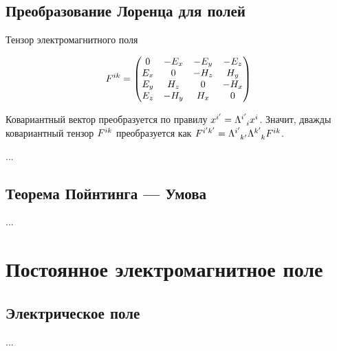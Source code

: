\documentclass{article}
\begin{document}
\subsection{Преобразование Лоренца для полей}

Тензор электромагнитного поля

\begin{equation}
    \tensor{F}{^i^k} =
    \begin{pmatrix}
        0 & -E_x & -E_y & -E_z \\
        E_x & 0 & -H_z & H_y \\
        E_y & H_z & 0 & -H_x \\
        E_z & -H_y & H_x & 0
    \end{pmatrix}
\end{equation}

Ковариантный вектор преобразуется по правилу $x^{i'}=\tensor{\Lambda}{^{i'}_{i}} x^i$. Значит, дважды ковариантный тензор $\tensor{F}{^i^k}$ преобразуется как $\tensor{F}{^{i'}^{k'}}=\tensor{\Lambda}{^{i'}_{k'}}\tensor{\Lambda}{^{k'}_{k}} \tensor{F}{^i^k}$.

...

\subsection{Теорема Пойнтинга — Умова}

...

\section{Постоянное электромагнитное поле}

\subsection{Электрическое поле}

...
\end{document}
